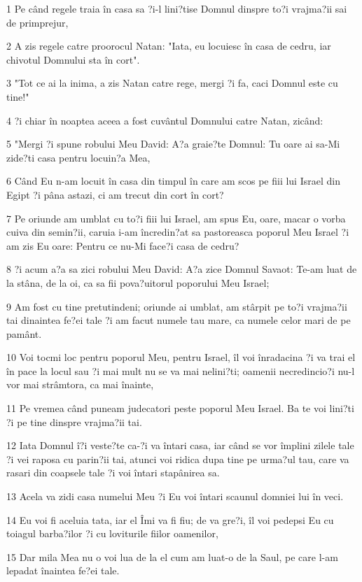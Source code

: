 \par 1 Pe când regele traia în casa sa ?i-l lini?tise Domnul dinspre to?i vrajma?ii sai de primprejur,
\par 2 A zis regele catre proorocul Natan: "Iata, eu locuiesc în casa de cedru, iar chivotul Domnului sta în cort".
\par 3 "Tot ce ai la inima, a zis Natan catre rege, mergi ?i fa, caci Domnul este cu tine!"
\par 4 ?i chiar în noaptea aceea a fost cuvântul Domnului catre Natan, zicând:
\par 5 "Mergi ?i spune robului Meu David: A?a graie?te Domnul: Tu oare ai sa-Mi zide?ti casa pentru locuin?a Mea,
\par 6 Când Eu n-am locuit în casa din timpul în care am scos pe fiii lui Israel din Egipt ?i pâna astazi, ci am trecut din cort în cort?
\par 7 Pe oriunde am umblat cu to?i fiii lui Israel, am spus Eu, oare, macar o vorba cuiva din semin?ii, caruia i-am încredin?at sa pastoreasca poporul Meu Israel ?i am zis Eu oare: Pentru ce nu-Mi face?i casa de cedru?
\par 8 ?i acum a?a sa zici robului Meu David: A?a zice Domnul Savaot: Te-am luat de la stâna, de la oi, ca sa fii pova?uitorul poporului Meu Israel;
\par 9 Am fost cu tine pretutindeni; oriunde ai umblat, am stârpit pe to?i vrajma?ii tai dinaintea fe?ei tale ?i am facut numele tau mare, ca numele celor mari de pe pamânt.
\par 10 Voi tocmi loc pentru poporul Meu, pentru Israel, îl voi înradacina ?i va trai el în pace la locul sau ?i mai mult nu se va mai nelini?ti; oamenii necredincio?i nu-l vor mai strâmtora, ca mai înainte,
\par 11 Pe vremea când puneam judecatori peste poporul Meu Israel. Ba te voi lini?ti ?i pe tine dinspre vrajma?ii tai.
\par 12 Iata Domnul î?i veste?te ca-?i va întari casa, iar când se vor împlini zilele tale ?i vei raposa cu parin?ii tai, atunci voi ridica dupa tine pe urma?ul tau, care va rasari din coapsele tale ?i voi întari stapânirea sa.
\par 13 Acela va zidi casa numelui Meu ?i Eu voi întari scaunul domniei lui în veci.
\par 14 Eu voi fi aceluia tata, iar el Îmi va fi fiu; de va gre?i, îl voi pedepsi Eu cu toiagul barba?ilor ?i cu loviturile fiilor oamenilor,
\par 15 Dar mila Mea nu o voi lua de la el cum am luat-o de la Saul, pe care l-am lepadat înaintea fe?ei tale.
